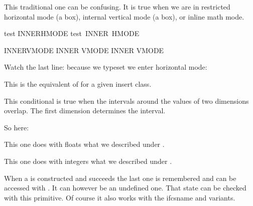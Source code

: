 This traditional one can be confusing. It is true when we are in restricted
horizontal mode (a box), internal vertical mode (a box), or inline math mode.

\startbuffer
test \ifhmode \ifinner INNER\fi HMODE\fi\crlf
\hbox{test \ifhmode \ifinner INNER \fi HMODE\fi} \par

\ifvmode \ifinner INNER\fi VMODE \fi\crlf
\vbox{\ifvmode \ifinner INNER \fi VMODE\fi} \crlf
\vbox{\ifinner INNER \ifvmode VMODE \fi \fi} \par
\stopbuffer

\typebuffer

Watch the last line: because we typeset  we enter horizontal mode:

{\getbuffer}

\stopoldprimitive

\startnewprimitive[title={\prm {ifinsert}}]

This is the equivalent of  for a given insert class.

\stopnewprimitive

\startnewprimitive[title={\prm {ifintervaldim}}]

This conditional is true when the intervals around the values of two dimensions
overlap. The first dimension determines the interval.

\stopbuffer

\typebuffer

So here: \inlinebuffer

\stopnewprimitive

\startnewprimitive[title={\prm {ifintervalfloat}}]

This one does with floats what we described under .

\stopnewprimitive

\startnewprimitive[title={\prm {ifintervalnum}}]

This one does with integers what we described under .

\stopnewprimitive

\startnewprimitive[title={\prm {iflastnamedcs}}]

When a  is constructed and succeeds the last one is remembered and
can be accessed with . It can however be an undefined one. That
state can be checked with this primitive. Of course it also works with the \prm
{ifcsname} and  variants.

